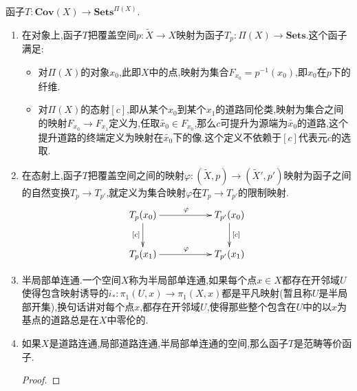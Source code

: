 函子$T:\textbf{Cov}(X)\to\textbf{Sets}^{\Pi(X)}$.
\begin{enumerate}
	\item 在对象上,函子$T$把覆盖空间$p:\widetilde{X}\to X$映射为函子$T_p:\Pi(X)\to\textbf{Sets}$.这个函子满足:
	\begin{itemize}
		\item 对$\Pi(X)$的对象$x_0$,此即$X$中的点,映射为集合$F_{x_0}=p^{-1}(x_0)$,即$x_0$在$p$下的纤维.
		\item 对$\Pi(X)$的态射$[c]$,即从某个$x_0$到某个$x_1$的道路同伦类,映射为集合之间的映射$F_{x_0}\to F_{x_1}$定义为,任取$\widetilde{x_0}\in F_{x_0}$,那么$c$可提升为源端为$\widetilde{x_0}$的道路,这个提升道路的终端定义为映射在$\widetilde{x_0}$下的像.这个定义不依赖于$[c]$代表元$c$的选取.
	\end{itemize}
	\item 在态射上,函子$T$把覆盖空间之间的映射$\varphi:(\widetilde{X},p)\to(\widetilde{X}',p')$映射为函子之间的自然变换$T_{p}\to T_{p'}$,就定义为集合映射$\varphi$在$T_{p}\to T_{p'}$的限制映射.
	$$\xymatrix{T_p(x_0)\ar[rr]^{\varphi}\ar[d]_{[c]}&&T_{p'}(x_0)\ar[d]^{[c]}\\T_p(x_1)\ar[rr]^{\varphi}&&T_{p'}(x_1)}$$
	\item 半局部单连通.一个空间$X$称为半局部单连通,如果每个点$x\in X$都存在开邻域$U$使得包含映射诱导的$i_*:\pi_1(U,x)\to\pi_1(X,x)$都是平凡映射(暂且称$U$是半局部开集),换句话讲对每个点$x$,都存在开邻域$U$,使得那些整个包含在$U$中的以$x$为基点的道路总是在$X$中零伦的.
	\item 如果$X$是道路连通,局部道路连通,半局部单连通的空间,那么函子$T$是范畴等价函子.
	\begin{proof}
		

\end{proof}
\end{enumerate}
